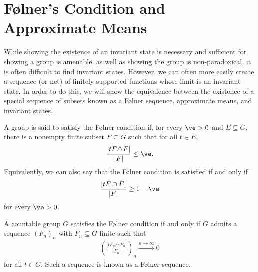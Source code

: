 \section{Følner's Condition and Approximate Means}%
While showing the existence of an invariant state is necessary and sufficient for showing a group is amenable, as well as showing the group is non-paradoxical, it is often difficult to find invariant states. However, we can often more easily create a sequence (or net) of finitely supported functions whose limit is an invariant state. In order to do this, we will show the equivalence between the existence of a special sequence of subsets known as a Følner sequence, approximate means, and invariant states.
\begin{definition}
  A group is said to satisfy the {Følner condition} if, for every $\ve > 0$ and $E\subseteq G$, there is a nonempty finite subset $F\subseteq G$ such that for all $t\in E$,
  \begin{align*}
    \frac{\left\vert tF\triangle F \right\vert}{\left\vert F \right\vert}\leq \ve.
  \end{align*}
  Equivalently, we can also say that the Følner condition is satisfied if and only if
  \begin{align*}
    \frac{\left\vert tF\cap F \right\vert}{\left\vert F \right\vert} \geq 1 - \ve
  \end{align*}
  for every $\ve > 0$.\label{def:folner_condition}
\end{definition}
\begin{lemma}
  A countable group $G$ satisfies the Følner condition if and only if $G$ admits a sequence $\left(F_n\right)_n$ with $F_n\subseteq G$ finite such that
  \begin{align*}
    \left(\frac{\left\vert tF_n\triangle F_n \right\vert}{\left\vert F_n \right\vert}\right)_n \xrightarrow{n\rightarrow \infty}0
  \end{align*}
  for all $t\in G$. Such a sequence is known as a Følner sequence.\label{lemma:folner_sequences}
\end{lemma}
